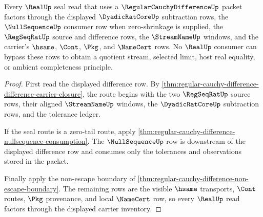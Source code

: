 \begin{theorem}
\label{thm:regular-cauchy-difference-real-seal-route}
Every $\RealUp$ seal read that uses a $\RegularCauchyDifferenceUp$ packet factors through the displayed $\DyadicRatCoreUp$ subtraction rows, the $\NullSequenceUp$ consumer row when zero-shrinkage is supplied, the $\RegSeqRatUp$ source and difference rows, the $\StreamNameUp$ windows, and the carrier's $\hsame$, $\Cont$, $\Pkg$, and $\NameCert$ rows. No $\RealUp$ consumer can bypass these rows to obtain a quotient stream, selected limit, host real equality, or ambient completeness principle.
\end{theorem}
\begin{proof}
First read the displayed difference row. By \autoref{thm:regular-cauchy-difference-difference-carrier-closure}, the route begins with the two $\RegSeqRatUp$ source rows, their aligned $\StreamNameUp$ windows, the $\DyadicRatCoreUp$ subtraction rows, and the tolerance ledger.

If the seal route is a zero-tail route, apply \autoref{thm:regular-cauchy-difference-nullsequence-consumption}. The $\NullSequenceUp$ row is downstream of the displayed difference row and consumes only the tolerances and observations stored in the packet.

Finally apply the non-escape boundary of \autoref{thm:regular-cauchy-difference-non-escape-boundary}. The remaining rows are the visible $\hsame$ transports, $\Cont$ routes, $\Pkg$ provenance, and local $\NameCert$ row, so every $\RealUp$ read factors through the displayed carrier inventory.
\end{proof}

